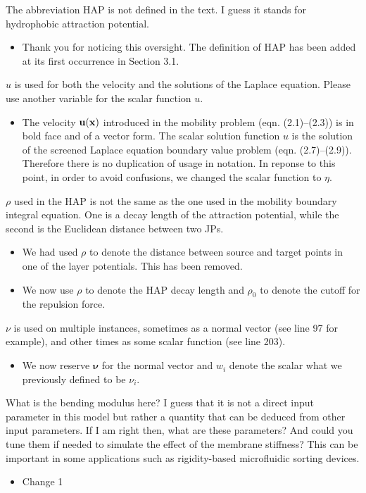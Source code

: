 \documentclass[11pt]{article}
\newcommand{\comment}[1]{{\color{blue} #1}}
\begin{document}
\noindent
\comment{The abbreviation HAP is not defined in the text. I guess it stands for hydrophobic attraction potential.
}
\begin{itemize}
  \item Thank you for noticing this oversight. The definition of HAP has
    been added at its first occurrence in Section 3.1. 
\end{itemize}

\noindent
\comment{$u$ is used for both the velocity and the solutions of the
Laplace equation. Please use another variable for the scalar function
$u$.}
\begin{itemize}
  \item The velocity ${\bf u}({\bf x})$ introduced in the mobility problem (eqn. (2.1)--(2.3)) is in bold face and of a vector form. The scalar solution function $u$ is the solution of the screened Laplace equation boundary value problem (eqn. (2.7)--(2.9)). Therefore there is no duplication of usage in notation. In reponse to this point, in order to avoid confusions, we changed the scalar function to $\eta$.
\end{itemize}

\noindent
\comment{$\rho$ used in the HAP is not the same as the one used in the
mobility boundary integral equation. One is a decay length of the
attraction potential, while the second is the Euclidean distance between
two JPs.}
\begin{itemize}
  \item We had used $\rho$ to denote the distance between source and
    target points in one of the layer potentials. This has been removed.

  \item We now use $\rho$ to denote the HAP decay length and $\rho_0$ to
    denote the cutoff for the repulsion force.
\end{itemize}

\noindent
\comment{$\nu$ is used on multiple instances, sometimes as a normal
vector (see line 97 for example), and other times as some scalar
function (see line 203).}
\begin{itemize}
  \item We now reserve $\boldsymbol{\nu}$ for the normal vector and
    $w_i$ denote the scalar what we previously defined to be $\nu_i$.
\end{itemize}

\noindent
\comment{What is the bending modulus here? I guess that it is not a
direct input parameter in this model but rather a quantity that can be
deduced from other input parameters. If I am right then, what are these
parameters? And could you tune them if needed to simulate the effect of
the membrane stiffness? This can be important in some applications such
as rigidity-based microfluidic sorting devices.}
\begin{itemize}
  \item Change 1 
\end{itemize}
\end{document}
